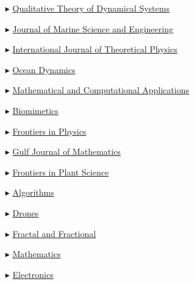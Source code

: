 \begin{itemize}
    \item[$\blacktriangleright$] \href{https://link.springer.com/journal/12346}{Qualitative Theory of Dynamical Systems}

    \item[$\blacktriangleright$] \href{https://www.mdpi.com/journal/jmse/}{Journal of Marine Science and Engineering}

    \item[$\blacktriangleright$] \href{https://link.springer.com/journal/10773/}{International Journal of Theoretical Physics}

    \item[$\blacktriangleright$] \href{https://link.springer.com/journal/10236/}{Ocean Dynamics}
    
    \item[$\blacktriangleright$] \href{https://www.mdpi.com/journal/mca/}{Mathematical and Computational Applications}

    \item[$\blacktriangleright$] \href{https://www.mdpi.com/journal/biomimetics/}{Biomimetics}

    \item[$\blacktriangleright$] \href{https://www.frontiersin.org/journals/physics/}{Frontiers in Physics}

    \item[$\blacktriangleright$] \href{https://gjom.org/}{Gulf Journal of Mathematics}

    \item[$\blacktriangleright$] \href{https://www.frontiersin.org/journals/plant-science/}{
Frontiers in Plant Science}

    \item[$\blacktriangleright$] \href{https://www.mdpi.com/journal/algorithms/}{Algorithms}

    \item[$\blacktriangleright$] \href{https://www.mdpi.com/journal/drones/}{Drones}

    \item[$\blacktriangleright$] \href{https://www.mdpi.com/journal/fractalfract/}{Fractal and Fractional}

    \item[$\blacktriangleright$] \href{https://www.mdpi.com/journal/mathematics/}{Mathematics}

    \item[$\blacktriangleright$] \href{https://www.mdpi.com/journal/electronics/}{Electronics}


\end{itemize}
